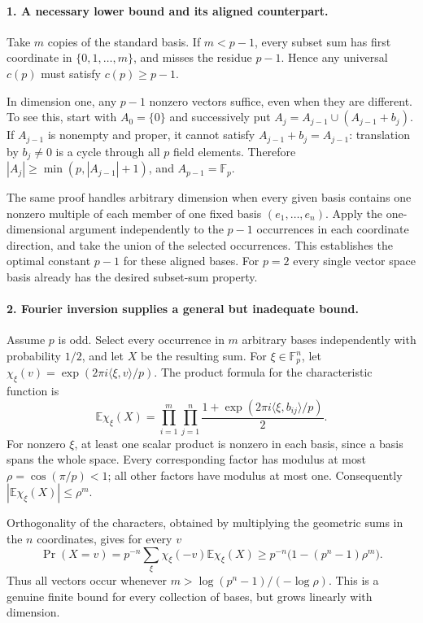\documentclass[11pt,a4paper]{article}
\begin{document}
\paragraph{1. A necessary lower bound and its aligned counterpart.}
Take $m$ copies of the standard basis. If $m<p-1$, every subset sum
has first coordinate in $\{0,1,\ldots,m\}$, and misses the residue
$p-1$. Hence any universal $c(p)$ must satisfy $c(p)\ge p-1$.

In dimension one, any $p-1$ nonzero vectors suffice, even when they
are different. To see this, start with $A_0=\{0\}$ and successively
put $A_j=A_{j-1}\cup(A_{j-1}+b_j)$. If $A_{j-1}$ is nonempty and
proper, it cannot satisfy $A_{j-1}+b_j=A_{j-1}$: translation by
$b_j\ne0$ is a cycle through all $p$ field elements. Therefore
$|A_j|\ge\min(p,|A_{j-1}|+1)$, and $A_{p-1}=\mathbb F_p$.

The same proof handles arbitrary dimension when every given basis
contains one nonzero multiple of each member of one fixed basis
$(e_1,\ldots,e_n)$. Apply the one-dimensional argument independently
to the $p-1$ occurrences in each coordinate direction, and take the
union of the selected occurrences. This establishes the optimal
constant $p-1$ for these aligned bases. For $p=2$ every single vector
space basis already has the desired subset-sum property.

\paragraph{2. Fourier inversion supplies a general but inadequate bound.}
Assume $p$ is odd. Select every occurrence in $m$ arbitrary bases
independently with probability $1/2$, and let $X$ be the resulting sum.
For $\xi\in\mathbb F_p^n$, let
$\chi_\xi(v)=\exp(2\pi i\langle\xi,v\rangle/p)$.
The product formula for the characteristic function is
\[
 \mathbb E\chi_\xi(X)=
 \prod_{i=1}^m\prod_{j=1}^n
 \frac{1+\exp(2\pi i\langle\xi,b_{ij}\rangle/p)}2.
\]
For nonzero $\xi$, at least one scalar product is nonzero in each
basis, since a basis spans the whole space. Every corresponding factor
has modulus at most $\rho=\cos(\pi/p)<1$; all other factors have
modulus at most one. Consequently
$|\mathbb E\chi_\xi(X)|\le\rho^m$.

Orthogonality of the characters, obtained by multiplying the geometric
sums in the $n$ coordinates, gives for every $v$
\[
 \Pr(X=v)=p^{-n}\sum_\xi
 \chi_\xi(-v)\mathbb E\chi_\xi(X)
 \ge p^{-n}\bigl(1-(p^n-1)\rho^m\bigr).
\]
Thus all vectors occur whenever
$m>\log(p^n-1)/(-\log\rho)$. This is a genuine finite bound for
every collection of bases, but grows linearly with dimension.
\end{document}
